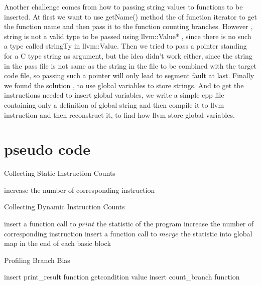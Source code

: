 \documentclass{article}
\begin{document}
Another challenge comes from how to passing string values to functions to be inserted. At first we want to use getName() method the of function iterator to get the function name and then pass it to the function counting branches. However , string is not a valid type to be passed using llvm::Value* , since there is no such a type called stringTy in llvm::Value. Then we tried to pass a pointer standing for a C type string as argument, but the idea {didn't} work either, since the string in the pass file is not same as the string in the file to be combined with the target code file, so passing such a pointer will only lead to segment fault at last. Finally we found the solution , to use global variables to store strings. And to get the instructions needed to insert global variables, we write a simple cpp file containing only a definition of global string and then compile it to llvm instruction and then reconstruct it, to find how llvm store global variables.


\section{pseudo code}

\begin{algorithm}[htb]
\caption{ Collecting Static Instruction Counts }
\begin{algorithmic}
			\STATE increase the number of corresponding instruction
		\ENDFOR
	\ENDFOR
\ENDFOR
\end{algorithmic}
\end{algorithm}



\begin{algorithm}[htb]
\caption{ Collecting Dynamic Instruction Counts }
\begin{algorithmic}
                \STATE insert a function call to $print$ the statistic of the program
			\ENDIF
			\STATE increase the number of corresponding instruction
		\ENDFOR
		\STATE insert a function call to $merge$ the statistic into global map in the end of each basic block
	\ENDFOR
\ENDFOR
\end{algorithmic}
\end{algorithm}


\begin{algorithm}[htb]
\caption{ Profiling Branch Bias}
\begin{algorithmic}
                \STATE insert print\_result function
            \ENDIF
                \STATE getcondition value
                \STATE insert count\_branch function
            \ENDIF
        \ENDFOR
    \ENDFOR
\ENDFOR

\end{algorithmic}
\end{algorithm}
\end{document}
